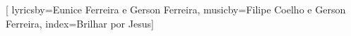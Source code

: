 %


[
lyricsby={Eunice Ferreira e Gerson Ferreira},
musicby={Filipe Coelho e Gerson Ferreira},
index={Brilhar por Jesus}]


